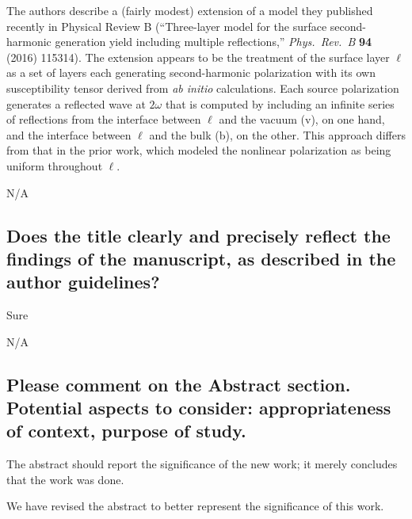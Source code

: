 \documentclass{article}
\begin{document}
The authors describe a (fairly modest) extension of a model
they published recently in Physical Review B (``Three-layer model for the
surface second-harmonic generation yield including multiple reflections,''
\emph{Phys.\ Rev.\ B} \textbf{94} (2016) 115314). The extension appears to
be the treatment of the surface layer $\ell$ as a set of layers each
generating second-harmonic polarization with its own susceptibility tensor
derived from \emph{ab initio} calculations. Each source polarization
generates a reflected wave at $2\omega$ that is computed by including an
infinite series of reflections from the interface between $\ell$ and the
vacuum (v), on one hand, and the interface between $\ell$ and the bulk (b),
on the other. This approach differs from that in the prior work, which
modeled the nonlinear polarization as being uniform throughout $\ell$.

\begin{shaded}
N/A
\end{shaded}


\subsection{Does the title clearly and precisely reflect the findings of the
manuscript, as described in the author guidelines?}

Sure

\begin{shaded}
N/A
\end{shaded}


\subsection{Please comment on the Abstract section. Potential aspects to
consider: appropriateness of context, purpose of study.}

The abstract should report the significance of the new work; it merely concludes
that the work was done.

\begin{shaded}
We have revised the abstract to better represent the significance of this work.
\end{shaded}

\end{document}
